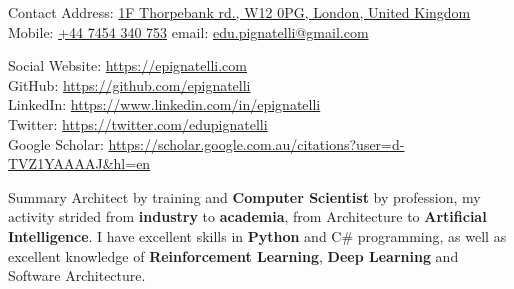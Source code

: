 \documentclass{resume}
\begin{document}
\begin{rSection}{Contact}
Address: \href{https://goo.gl/maps/Gwa9BTP2ARx}{1F Thorpebank rd., W12 0PG, London, United Kingdom} \\
Mobile: \href{tel:07454340753}{+44 7454 340 753} \quad \quad \quad \quad \quad \quad \quad email: \href{mailto:edu.pignatelli@gmail.com}{edu.pignatelli@gmail.com}
\end{rSection}

\begin{rSection}{Social}
Website: \href{https://epignatelli.com}{https://epignatelli.com} \\
GitHub: \href{https://github.com/epignatelli}{https://github.com/epignatelli} \\
LinkedIn: \href{https://www.linkedin.com/in/epignatelli}{https://www.linkedin.com/in/epignatelli} \\
Twitter: \href{https://twitter.com/edupignatelli}{https://twitter.com/edupignatelli} \\
Google Scholar: \href{https://scholar.google.com.au/citations?user=d-TVZ1YAAAAJ\&hl=en}{https://scholar.google.com.au/citations?user=d-TVZ1YAAAAJ\&hl=en}
\end{rSection}

\begin{rSection}{Summary}
Architect by training and \textbf{Computer Scientist} by profession, my activity strided from \textbf{industry} to \textbf{academia}, from Architecture to \textbf{Artificial Intelligence}. I have excellent skills in \textbf{Python} and C\# programming, as well as excellent knowledge of \textbf{Reinforcement Learning}, \textbf{Deep Learning} and Software Architecture.
\end{rSection}
\end{document}

